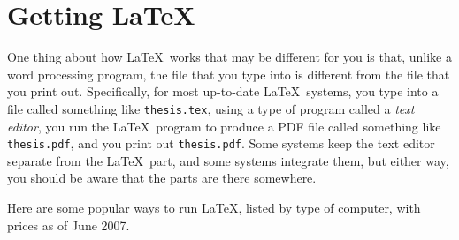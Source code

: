 \documentclass[modernstyle,12pt]{sjsuthesis}
\theoremstyle{definition}
\begin{document}
\section{Getting \LaTeX}

One thing about how \LaTeX\ works that may be different for you is
that, unlike a word processing program, the file that you type into is
different from the file that you print out.  Specifically, for most
up-to-date \LaTeX\ systems, you type into a file called something like
{\tt thesis.tex}, using a type of program called a {\it text editor},
you run the \LaTeX\ program to produce a PDF file called something
like {\tt thesis.pdf}, and you print out {\tt thesis.pdf}.  Some
systems keep the text editor separate from the \LaTeX\ part, and some
systems integrate them, but either way, you should be aware that the
parts are there somewhere.

Here are some popular ways to run \LaTeX, listed by type of computer,
with prices as of June 2007.
\end{document}
